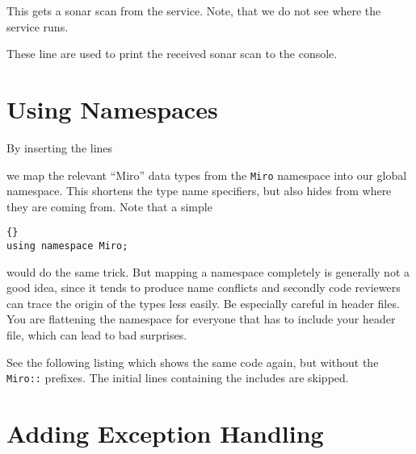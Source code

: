 

This gets a sonar scan from the service. Note, that we do not see where 
the service runs.



These line are used to print the received sonar scan to the console.

%




\section{Using Namespaces}

By inserting the lines



we map the relevant ``Miro'' data types from the \lstinline!Miro!
namespace into our global namespace. This shortens the type name
specifiers, but also hides from where they are coming from. Note that
a simple

\begin{lstlisting}[frame=tb]{}
using namespace Miro;
\end{lstlisting}

would do the same trick. But mapping a namespace completely is
generally not a good idea, since it tends to produce name conflicts
and secondly code reviewers can trace the origin of the types less
easily. Be especially careful in header files. You are flattening the
namespace for everyone that has to include your header file, which can
lead to bad surprises.

See the following listing which shows the same code again, but without
the \lstinline!Miro::! prefixes. The initial lines containing the includes
are skipped.




\section{Adding Exception Handling}


